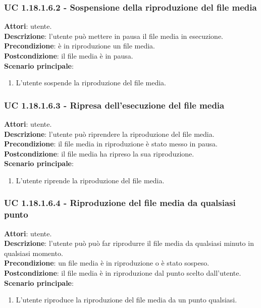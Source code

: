 	\subsubsection{UC 1.18.1.6.2 - Sospensione della riproduzione del file media}{
		\label{uc1.18.1.6.2}
		\textbf{Attori}: utente. \\
		\textbf{Descrizione}: l'utente può mettere in pausa il file media in esecuzione. \\
		\textbf{Precondizione}: è in riproduzione un file media.	\\
		\textbf{Postcondizione}: il file media è in pausa.\\
		\textbf{Scenario principale}:
		\begin{enumerate}
			\item L'utente sospende la riproduzione del file media.
		\end{enumerate}		
	}
	\subsubsection{UC 1.18.1.6.3 - Ripresa dell'esecuzione del file media}{
		\label{uc1.18.1.6.3}
		\textbf{Attori}: utente. \\
		\textbf{Descrizione}: l'utente può riprendere la riproduzione del file media. \\
		\textbf{Precondizione}: il file media in riproduzione è stato messo in pausa.	\\
		\textbf{Postcondizione}: il file media ha ripreso la sua riproduzione.\\
		\textbf{Scenario principale}:
		\begin{enumerate}
			\item L'utente riprende la riproduzione del file media.
		\end{enumerate}		
	}
	\subsubsection{UC 1.18.1.6.4 - Riproduzione del file media da qualsiasi punto}{
		\label{uc1.18.1.6.4}
		\textbf{Attori}: utente. \\
		\textbf{Descrizione}: l'utente può può far riprodurre il file media da qualsiasi minuto in qualsiasi momento. \\
		\textbf{Precondizione}: un file media è in riproduzione o è stato sospeso.	\\
		\textbf{Postcondizione}: il file media è in riproduzione dal punto scelto dall'utente.\\
		\textbf{Scenario principale}:
		\begin{enumerate}
			\item L'utente riproduce la riproduzione del file media da un punto qualsiasi.
		\end{enumerate}		
	}
